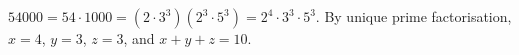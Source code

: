 $54000=54\cdot1000=\left(2\cdot3^3\right)\left(2^3\cdot5^3\right)=2^4\cdot3^3\cdot5^3$. By unique prime factorisation, $x=4$, $y=3$, $z=3$, and $x+y+z=\boxed{10}$.
